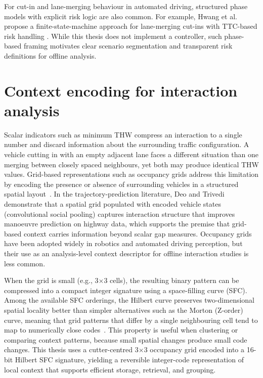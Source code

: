 \documentclass[12pt,a4paper,twoside,openright]{report}
\begin{document}
    For cut-in and lane-merging behaviour in automated driving, structured phase models with explicit risk logic are also common. For example, Hwang et al. propose a finite-state-machine approach for lane-merging cut-ins with TTC-based risk handling \cite{hwang2022fsmrl}. While this thesis does not implement a controller, such phase-based framing motivates clear scenario segmentation and transparent risk definitions for offline analysis.

    \section{Context encoding for interaction analysis}
    Scalar indicators such as minimum THW compress an interaction to a single number and discard information about the surrounding traffic configuration. A vehicle cutting in with an empty adjacent lane faces a different situation than one merging between closely spaced neighbours, yet both may produce identical THW values. Grid-based representations such as occupancy grids address this limitation by encoding the presence or absence of surrounding vehicles in a structured spatial layout~\cite{elfes1989}. In the trajectory-prediction literature, Deo and Trivedi~\cite{deo2018csp} demonstrate that a spatial grid populated with encoded vehicle states (convolutional social pooling) captures interaction structure that improves manoeuvre prediction on highway data, which supports the premise that grid-based context carries information beyond scalar gap measures. Occupancy grids have been adopted widely in robotics and automated driving perception, but their use as an analysis-level context descriptor for offline interaction studies is less common.

    When the grid is small (e.g., 3$\times$3 cells), the resulting binary pattern can be compressed into a compact integer signature using a space-filling curve (SFC). Among the available SFC orderings, the Hilbert curve preserves two-dimensional spatial locality better than simpler alternatives such as the Morton (Z-order) curve, meaning that grid patterns that differ by a single neighbouring cell tend to map to numerically close codes~\cite{moon2001}. This property is useful when clustering or comparing context patterns, because small spatial changes produce small code changes. This thesis uses a cutter-centred 3$\times$3 occupancy grid encoded into a 16-bit Hilbert SFC signature, yielding a reversible integer-code representation of local context that supports efficient storage, retrieval, and grouping.
\end{document}
